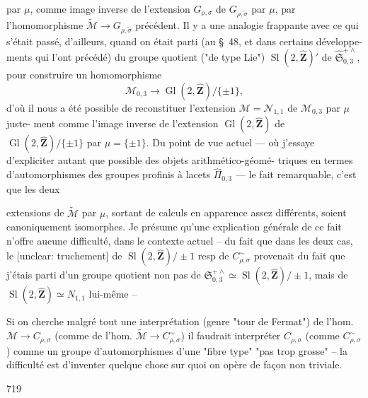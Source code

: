 par $\mu$, comme image inverse de l'extension
$G_{\rho, \sigma}$ de $G_{\rho, \tilde{\sigma}}$ par $\mu$, par l'homomorphisme
$\tilde{\mathcal{M}} \to G_{\rho, \tilde{\sigma}}$ précédent. Il y a une
analogie frappante avec ce qui s'était
passé, d'ailleurs, quand on était
parti (au \S\ 48, et dans certains développe-
ments qui l'ont précédé) du groupe
quotient ("de type Lie") $\operatorname{Sl}(2, \hat{\mathbf{Z}})'$ de
$\hat{\mathfrak{S}}_{0,3}^{+ \wedge}$, pour construire un homomorphisme
$$ \mathcal{M}_{0,3} \to \operatorname{Gl}(2, \hat{\mathbf{Z}})/\{\pm 1\}, $$
d'où il nous a été possible de reconstituer
l'extension $\mathcal{M} = \mathcal{N}_{1,1}$ de $\mathcal{M}_{0,3}$ par $\mu$ juste-
ment comme l'image inverse de
l'extension $\operatorname{Gl}(2, \hat{\mathbf{Z}})$ de $\operatorname{Gl}(2, \hat{\mathbf{Z}})/\{\pm 1\}$
par $\mu = \{\pm 1\}$. Du point de vue actuel
--- où j'essaye d'expliciter autant que
possible des objets arithmético-géomé-
triques en termes d'automorphismes
des groupes profinis à lacets $\hat{\Pi}_{0,3}$ --- le fait
remarquable, c'est que les deux

\newpage


extensions de $\tilde{\mathcal{M}}$ par $\mu$, sortant de calculs en apparence assez différents, soient canoniquement isomorphes. Je présume qu'une explication générale de ce fait n'offre aucune difficulté, dans le contexte actuel -- du fait que dans les deux cas, le [unclear: truchement] de $\operatorname{Sl}(2,\hat{\mathbf{Z}})/\pm 1$ resp de $C_{\rho, \sigma}^\sim$ provenait du fait que j'étais parti d'un groupe quotient non pas de $\mathfrak{S}_{0,3}^{+\wedge} \simeq \operatorname{Sl}(2,\hat{\mathbf{Z}})/\pm 1$, mais de $\operatorname{Sl}(2,\hat{\mathbf{Z}}) \simeq N_{1,1}$ lui-même --

Si on cherche malgré tout une interprétation (genre "tour de Fermat") de l'hom. $\mathcal{M} \to C_{\rho, \sigma}$ (comme de l'hom. $\tilde{\mathcal{M}} \to C_{\rho, \sigma}^\sim$) il faudrait interpréter $C_{\rho,\sigma}$ (comme $C_{\rho, \sigma}^\sim$) comme un groupe d'automorphismes d'une "fibre type" "pas trop grosse" -- la difficulté est d'inventer quelque chose sur quoi on opère de façon non triviale.

\newpage


719

